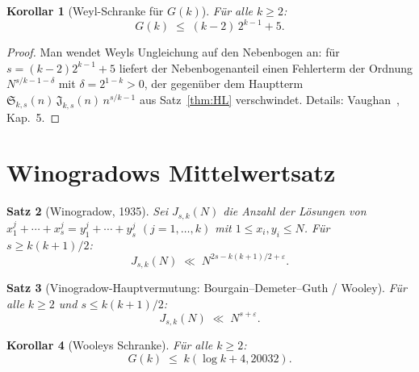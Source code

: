 \documentclass[12pt,a4paper]{amsart}
\newtheorem{theorem}{Satz}[section]
\newtheorem{korollar}[theorem]{Korollar}
\theoremstyle{definition}
\begin{document}
\begin{korollar}[Weyl-Schranke für $G(k)$]\label{cor:gk_weyl}
  Für alle $k \geq 2$:
  \[
    G(k) \;\leq\; (k-2)\,2^{k-1} + 5.
  \]
\end{korollar}

\begin{proof}
  Man wendet Weyls Ungleichung auf den Nebenbogen an: für $s = (k-2)2^{k-1}+5$
  liefert der Nebenbogenanteil einen Fehlerterm der Ordnung $N^{s/k-1-\delta}$
  mit $\delta = 2^{1-k} > 0$, der gegenüber dem Hauptterm $\mathfrak{S}_{k,s}(n)\,
  \mathfrak{J}_{k,s}(n)\, n^{s/k-1}$ aus Satz~\ref{thm:HL} verschwindet.
  Details: Vaughan~\cite{Vaughan1981}, Kap.~5.
\end{proof}

\section{Winogradows Mittelwertsatz}
\label{sec:mvs}

\begin{theorem}[Winogradow, 1935]\label{thm:wmvt}
  Sei $J_{s,k}(N)$ die Anzahl der Lösungen von
  $x_1^j + \cdots + x_s^j = y_1^j + \cdots + y_s^j$ $(j=1,\ldots,k)$
  mit $1 \leq x_i, y_i \leq N$.  Für $s \geq k(k+1)/2$:
  \[
    J_{s,k}(N) \;\ll\; N^{2s - k(k+1)/2 + \varepsilon}.
  \]
\end{theorem}

\begin{theorem}[Vinogradow-Hauptvermutung: Bourgain--Demeter--Guth / Wooley]\label{thm:bdg}
  Für alle $k \geq 2$ und $s \leq k(k+1)/2$:
  \[
    J_{s,k}(N) \;\ll\; N^{s + \varepsilon}.
  \]
\end{theorem}

\begin{korollar}[Wooleys Schranke]\label{cor:wooley}
  Für alle $k \geq 2$:
  \[
    G(k) \;\leq\; k(\log k + 4{,}20032).
  \]
\end{korollar}
\end{document}
